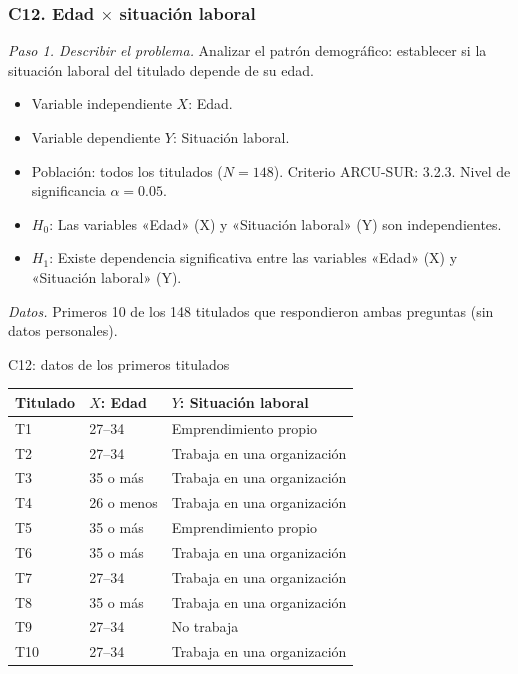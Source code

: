 \subsubsection*{C12. Edad $\times$ situación laboral}

\textit{Paso 1. Describir el problema.} Analizar el patrón demográfico: establecer si la situación laboral del titulado depende de su edad.

\begin{itemize}[nosep]
  \item Variable independiente $X$: Edad.
  \item Variable dependiente $Y$: Situación laboral.
  \item Población: todos los titulados ($N = 148$). Criterio ARCU-SUR: 3.2.3. Nivel de significancia $\alpha = 0.05$.
  \item $H_0$: Las variables «Edad» (X) y «Situación laboral» (Y) son independientes.
  \item $H_1$: Existe dependencia significativa entre las variables «Edad» (X) y «Situación laboral» (Y).
\end{itemize}

\textit{Datos.} Primeros 10 de los 148 titulados que respondieron ambas preguntas (sin datos personales).

\begin{mitabla}{C12: datos de los primeros titulados}
\begin{tabular}{lll}
\toprule
Titulado & $X$: Edad & $Y$: Situación laboral \\
\midrule
T1 & 27–34 & Emprendimiento propio \\
T2 & 27–34 & Trabaja en una organización \\
T3 & 35 o más & Trabaja en una organización \\
T4 & 26 o menos & Trabaja en una organización \\
T5 & 35 o más & Emprendimiento propio \\
T6 & 35 o más & Trabaja en una organización \\
T7 & 27–34 & Trabaja en una organización \\
T8 & 35 o más & Trabaja en una organización \\
T9 & 27–34 & No trabaja \\
T10 & 27–34 & Trabaja en una organización \\
\bottomrule
\end{tabular}
\end{mitabla}

